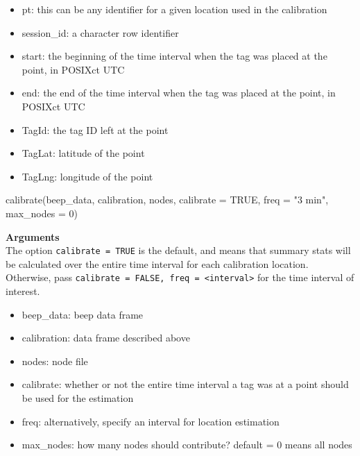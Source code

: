 \documentclass[
]{book}
\newenvironment{Shaded}{\begin{snugshade}}{\end{snugshade}}
\newcommand{\AttributeTok}[1]{\textcolor[rgb]{0.77,0.63,0.00}{#1}}
\newcommand{\ConstantTok}[1]{\textcolor[rgb]{0.00,0.00,0.00}{#1}}
\newcommand{\DecValTok}[1]{\textcolor[rgb]{0.00,0.00,0.81}{#1}}
\newcommand{\FunctionTok}[1]{\textcolor[rgb]{0.00,0.00,0.00}{#1}}
\newcommand{\NormalTok}[1]{#1}
\newcommand{\StringTok}[1]{\textcolor[rgb]{0.31,0.60,0.02}{#1}}
\providecommand{\tightlist}{%
  \setlength{\itemsep}{0pt}\setlength{\parskip}{0pt}}
\begin{document}
\begin{itemize}
\tightlist
\item
  pt: this can be any identifier for a given location used in the calibration\\
\item
  session\_id: a character row identifier
\item
  start: the beginning of the time interval when the tag was placed at the point, in POSIXct UTC\\
\item
  end: the end of the time interval when the tag was placed at the point, in POSIXct UTC\\
\item
  TagId: the tag ID left at the point\\
\item
  TagLat: latitude of the point\\
\item
  TagLng: longitude of the point
\end{itemize}

\begin{Shaded}
\begin{Highlighting}[]
\FunctionTok{calibrate}\NormalTok{(beep\_data, calibration, nodes, }\AttributeTok{calibrate =} \ConstantTok{TRUE}\NormalTok{, }\AttributeTok{freq =} \StringTok{"3 min"}\NormalTok{, }\AttributeTok{max\_nodes =} \DecValTok{0}\NormalTok{)}
\end{Highlighting}
\end{Shaded}

\textbf{Arguments}\\
The option \texttt{calibrate\ =\ TRUE} is the default, and means that summary stats will be calculated over the entire time interval for each calibration location. Otherwise, pass \texttt{calibrate\ =\ FALSE,\ freq\ =\ \textless{}interval\textgreater{}} for the time interval of interest.

\begin{itemize}
\tightlist
\item
  beep\_data: beep data frame\\
\item
  calibration: data frame described above\\
\item
  nodes: node file\\
\item
  calibrate: whether or not the entire time interval a tag was at a point should be used for the estimation
\item
  freq: alternatively, specify an interval for location estimation
\item
  max\_nodes: how many nodes should contribute? default = 0 means all nodes
\end{itemize}
\end{document}
